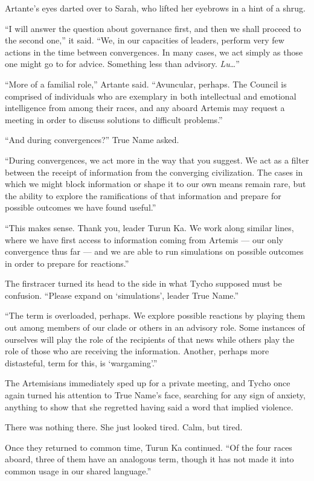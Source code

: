 Artante's eyes darted over to Sarah, who lifted her eyebrows in a hint of a shrug.

``I will answer the question about governance first, and then we shall proceed to the second one,'' it said. ``We, in our capacities of leaders, perform very few actions in the time between convergences. In many cases, we act simply as those one might go to for advice. Something less than advisory. \emph{Lu}\ldots{}''

``More of a familial role,'' Artante said. ``Avuncular, perhaps. The Council is comprised of individuals who are exemplary in both intellectual and emotional intelligence from among their races, and any aboard Artemis may request a meeting in order to discuss solutions to difficult problems.''

``And during convergences?'' True Name asked.

``During convergences, we act more in the way that you suggest. We act as a filter between the receipt of information from the converging civilization. The cases in which we might block information or shape it to our own means remain rare, but the ability to explore the ramifications of that information and prepare for possible outcomes we have found useful.''

``This makes sense. Thank you, leader Turun Ka. We work along similar lines, where we have first access to information coming from Artemis — our only convergence thus far — and we are able to run simulations on possible outcomes in order to prepare for reactions.''

The firstracer turned its head to the side in what Tycho supposed must be confusion. ``Please expand on `simulations', leader True Name.''

``The term is overloaded, perhaps. We explore possible reactions by playing them out among members of our clade or others in an advisory role. Some instances of ourselves will play the role of the recipients of that news while others play the role of those who are receiving the information. Another, perhaps more distasteful, term for this, is `wargaming'.''

The Artemisians immediately sped up for a private meeting, and Tycho once again turned his attention to True Name's face, searching for any sign of anxiety, anything to show that she regretted having said a word that implied violence.

There was nothing there. She just looked tired. Calm, but tired.

Once they returned to common time, Turun Ka continued. ``Of the four races aboard, three of them have an analogous term, though it has not made it into common usage in our shared language.''

